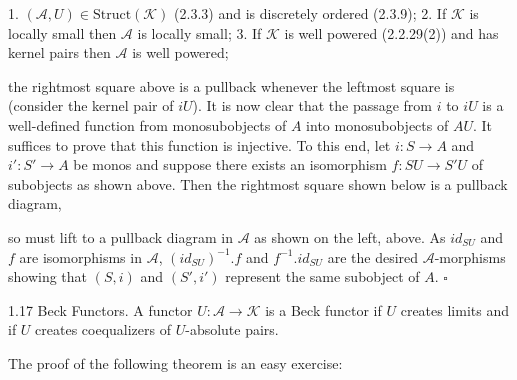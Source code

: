 1. $(\mathcal{A}, U) \in \text{Struct}(\mathcal{K})$ (2.3.3) and is discretely ordered (2.3.9);
2. If $\mathcal{K}$ is locally small then $\mathcal{A}$ is locally small;
3. If $\mathcal{K}$ is well powered (2.2.29(2)) and has kernel pairs then $\mathcal{A}$ is well powered;

the rightmost square above is a pullback whenever the leftmost square is (consider the kernel pair of $iU$). It is now clear that the passage from $i$ to $iU$ is a well-defined function from monosubobjects of $A$ into monosubobjects of $AU$. It suffices to prove that this function is injective. To this end, let $i:S \rightarrow A$ and $i':S' \rightarrow A$ be monos and suppose there exists an isomorphism $f:SU \rightarrow S'U$ of subobjects as shown above. Then the rightmost square shown below is a pullback diagram,

so must lift to a pullback diagram in $\mathcal{A}$ as shown on the left, above. As $id_{SU}$ and $f$ are isomorphisms in $\mathcal{A}$, $(id_{SU})^{-1}.f$ and $f^{-1}.id_{SU}$ are the desired $\mathcal{A}$-morphisms showing that $(S, i)$ and $(S', i')$ represent the same subobject of $A$. $\square$

1.17 Beck Functors. A functor $U: \mathcal{A} \rightarrow \mathcal{K}$ is a Beck functor if $U$ creates limits and if $U$ creates coequalizers of $U$-absolute pairs.

The proof of the following theorem is an easy exercise: